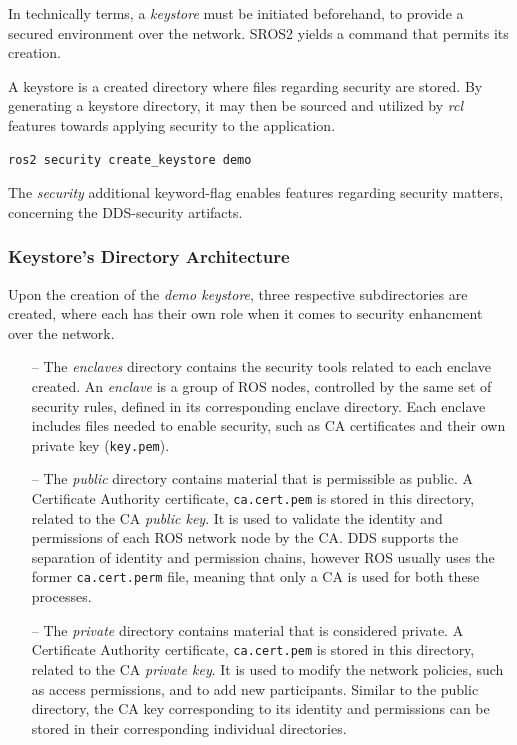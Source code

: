 In technically terms, a \textit{keystore} must be initiated beforehand, to provide a secured environment over the network. SROS2 yields a command that permits its creation. 

A keystore is a created directory where files regarding security are stored. By generating a keystore directory, it may then be sourced and utilized by \textit{rcl} features towards applying security to the application.
            
\begin{lstlisting}[title={\textit{Keystore} creation using the proper SROS2 command.}]
ros2 security create_keystore demo
\end{lstlisting}

The \textit{security} additional keyword-flag enables features regarding security matters, concerning the DDS-security artifacts.

\subsubsection{Keystore's Directory Architecture}

Upon the creation of the \textit{demo keystore}, three respective subdirectories are created, where each has their own role when it comes to security enhancment over the network.

\begin{itemize}
    \item[--] The \textit{enclaves} directory contains the security tools related to each enclave created. An \textit{enclave} is a group of ROS nodes, controlled by the same set of security rules, defined in its corresponding enclave directory. Each enclave includes files needed to enable security, such as CA certificates and their own private key (\texttt{key.pem}). %
    \item[--] The \textit{public} directory contains material that is permissible as public. A Certificate Authority certificate, \texttt{ca.cert.pem} is stored in this directory, related to the CA \textit{public key}. It is used to validate the identity and permissions of each ROS network node by the CA. DDS supports the separation of identity and permission chains, however ROS usually uses the former \texttt{ca.cert.perm} file, meaning that only a CA is used for both these processes.
    \item[--] The \textit{private} directory contains material that is considered private. A Certificate Authority certificate, \texttt{ca.cert.pem} is stored in this directory, related to the CA \textit{private key}. It is used to modify the network policies, such as access permissions, and to add new participants. Similar to the public directory, the CA key corresponding to its identity and permissions can be stored in their corresponding individual directories.
\end{itemize}

